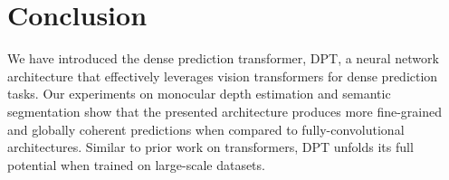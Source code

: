 \documentclass[10pt,twocolumn,letterpaper]{article}
\begin{document}
\section{Conclusion}
We have introduced the dense prediction transformer, DPT, a neural network
architecture that effectively leverages vision transformers for dense prediction
tasks. Our experiments on monocular depth estimation and semantic segmentation
show that the presented architecture produces more fine-grained and globally
coherent predictions when compared to fully-convolutional architectures. Similar
to prior work on transformers, DPT unfolds its full potential when trained on
large-scale datasets.

{\small   }

\newpage

\appendix

\renewcommand{\thefigure}{A\arabic{figure}}
\renewcommand{\theHfigure}{A\arabic{figure}}
\setcounter{figure}{0}

\renewcommand{\thetable}{A\arabic{table}}
\renewcommand{\theHtable}{A\arabic{table}}
\setcounter{table}{0}



\end{document}
